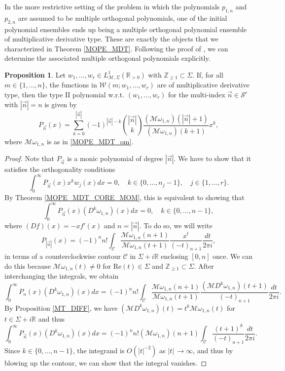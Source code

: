 \documentclass[a4paper,12pt,oneside]{article}
\theoremstyle{definition}
\newtheorem{prop}[defi]{Proposition}
\newcommand{\Z}{\mathbb{Z}}
\newcommand{\R}{\mathbb{R}}
\newcommand{\om}{\omega}
\newcommand{\sz}[1]{\left| \vec{#1} \right|}
\newcommand{\MT}[1]{\mathcal{M}#1}
\begin{document}
In the more restrictive setting of the problem in which the polynomials $p_{1,n}$ and $p_{2,n}$ are assumed to be multiple orthogonal polynomials, one of the initial polynomial ensembles ends up being a multiple orthogonal polynomial ensemble of multiplicative derivative type. These are exactly the objects that we characterized in Theorem \ref{MOPE_MDT}. Following the proof of \cite[Lem. 4.2]{KK:SV_EV}, we can determine the associated multiple orthogonal polynomials explicitly.


\begin{prop} \label{MDT_MOP}  
     Let $w_1,\dots,w_r\in L^1_{\MT{},\Sigma}(\R_{>0})$ with $\Z_{\geq 1}\subset \Sigma$. If, for all $m\in\{1,\dots,n\}$, the functions in $\mathcal{W}(m;w_1,\dots,w_r)$ are of multiplicative derivative type, then the type II polynomial w.r.t. $(w_1,\dots,w_r)$ for the multi-index $\vec{n}\in\mathcal{S}^r$ with $\sz{n}=n$ is given by
    \begin{equation} \label{MDT_MOP_FORM}
        P_{\vec{n}}(x) = \sum_{k=0}^{\sz{n}} (-1)^{\sz{n}-k} \binom{\sz{n}}{k} \frac{(\MT{\om_{1,n}})(\sz{n}+1)}{(\MT{\om_{1,n}})(k+1)} x^k,
    \end{equation}
    where $\MT{\om_{1,n}}$ is as in \eqref{MOPE_MDT_om}.
\end{prop}
\begin{proof}
    Note that $P_{\vec{n}}$ is a monic polynomial of degree $\sz{n}$. We have to show that it satisfies the orthogonality conditions
        $$ \int_0^\infty P_{\vec{n}}(x) x^k w_j(x) dx = 0,\quad k\in\{0,\dots,n_j-1\},\quad j\in\{1,\dots,r\}. $$
    By Theorem \ref{MOPE_MDT_CORE_MOM}, this is equivalent to showing that
        $$ \int_0^\infty P_{\vec{n}}(x) (D^{k}\om_{1,n})(x) dx = 0,\quad k\in\{0,\dots,n-1\}, $$
    where $(Df)(x)=-xf'(x)$ and $n=\sz{n}$. To do so, we will write
        $$ P_{\sz{n}}(x) = (-1)^n n! \int_{\mathcal{C}} \frac{\MT{\om_{1,n}}(n+1)}{\MT{\om_{1,n}}(t+1)}  \frac{x^t}{(-t)_{n+1}} \frac{dt}{2\pi i},  $$
    in terms of a counterclockwise contour $\mathcal{C}$ in $\Sigma+i\R$ enclosing $[0,n]$ once. We can do this because $\MT{\om_{1,n}}(t)\neq 0$ for $\text{Re}(t)\in\Sigma$ and $\Z_{\geq 1}\subset\Sigma$. After interchanging the integrals, we obtain
    $$\int_0^\infty P_n(x) (D^{k}\om_{1,n})(x) dx = (-1)^n n! \int_{\mathcal{C}} \frac{\MT{\om_{1,n}}(n+1)}{\MT{\om_{1,n}}(t+1)}  \frac{(\MT{D^k\om_{1,n}})(t+1)}{(-t)_{n+1}} \frac{dt}{2\pi i}. $$
    By Proposition \ref{MT_DIFF}, we have $(\MT{D^k\om_{1,n}})(t)=t^k \MT{\om_{1,n}}(t)$ for $t\in\Sigma+i\R$ and thus
    $$\int_0^\infty P_{\vec{n}}(x) (D^{k}\om_{1,n})(x) dx = (-1)^n n! (\mathcal{M}\om_{1,n})(n+1) \int_{\mathcal{C}} \frac{(t+1)^k}{(-t)_{n+1}} \frac{dt}{2\pi i}.$$
    Since $k\in\{0,\dots,n-1\}$, the integrand is $O(|t|^{-2})$ as $|t|\,\to\infty$, and thus by blowing up the contour, we can show that the integral vanishes.   
\end{proof}
\end{document}
